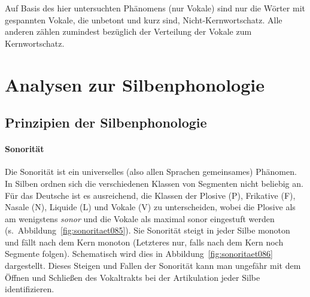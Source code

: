 Auf Basis des hier untersuchten Phänomens (nur Vokale) sind nur die Wörter mit gespannten Vokale, die unbetont und kurz sind, Nicht-Kernwortschatz.
Alle anderen zählen zumindest bezüglich der Verteilung der Vokale zum Kernwortschatz.




\newpage

\section{Analysen zur Silbenphonologie}
\label{sec:phonologie:analysenzursilbenphonologie}

\subsection{Prinzipien der Silbenphonologie}

\paragraph*{Sonorität}

Die Sonorität ist ein universelles (also allen Sprachen gemeinsames) Phänomen.
In Silben ordnen sich die verschiedenen Klassen von Segmenten nicht beliebig an.
Für das Deutsche ist es ausreichend, die Klassen der Plosive (P), Frikative (F), Nasale (N), Liquide (L) und Vokale (V) zu unterscheiden, wobei die Plosive als am wenigstens \textit{sonor} und die Vokale als maximal sonor eingestuft werden (s.~Abbildung~\ref{fig:sonoritaet085}).
Sie Sonorität steigt in jeder Silbe monoton und fällt nach dem Kern monoton (Letzteres nur, falls nach dem Kern noch Segmente folgen).
Schematisch wird dies in Abbildung~\ref{fig:sonoritaet086} dargestellt.
Dieses Steigen und Fallen der Sonorität kann man ungefähr mit dem Öffnen und Schließen des Vokaltrakts bei der Artikulation jeder Silbe identifizieren.

